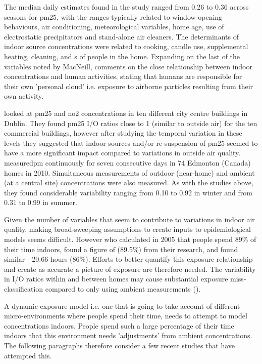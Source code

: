 The median daily estimates found in the study ranged from 0.26 to 0.36 across seasons for \gls{pm25}, with the ranges typically related to window-opening behaviours, air conditioning, meteorological variables, home age, use of electrostatic precipitators and stand-alone air cleaners. The determinants of indoor source concentrations were related to cooking, candle use, supplemental heating, cleaning, and s of people in the home. Expanding on the last of the variables noted by MacNeill, \cite{Colbeck2010a} comments on the close relationship between indoor concentrations and human activities, stating that humans are responsible for their own 'personal cloud' i.e. exposure to airborne particles resulting from their own activity.

\cite{Challoner2014} looked at \gls{pm25} and \gls{no2} concentrations in ten different city centre buildings in Dublin. They found \gls{pm25} I/O ratios close to 1 (similar to outside air) for the ten commercial buildings, however after studying the temporal variation in these levels they suggested that indoor sources and/or re-suspension of \gls{pm25} seemed to have a more significant impact compared to variations in outside air quality. \cite{Kearney2014} measured\gls{pm} continuously for seven consecutive days in 74 Edmonton (Canada) homes in 2010. Simultaneous measurements of outdoor (near-home) and ambient (at a central site) concentrations were also measured. As with the studies above, they found considerable variability ranging from 0.10 to 0.92 in winter and from 0.31 to 0.99 in summer.

Given the number of variables that seem to contribute to variations in indoor air quality, making broad-sweeping assumptions to create inputs to epidemiological models seems difficult. However \gls{who} calculated in 2005 that people spend 89\% of their time indoors, \cite{Lai2004a} found a figure of (89.5\%) from their research, and \cite{Schweizer2007} found similar - 20.66 hours (86\%). Efforts to better quantify this exposure relationship and create as accurate a picture of exposure are therefore needed. The variability in I/O ratios within and between homes may cause substantial exposure miss-classification compared to only using ambient measurements (\cite{Kearney2014}).

A dynamic exposure model i.e. one that is going to take account of different micro-environments where people spend their time, needs to attempt to model concentrations indoors. People spend such a large percentage of their time indoors that this environment needs 'adjustments' from ambient concentrations. The following paragraphs therefore consider a few recent studies that have attempted this.


